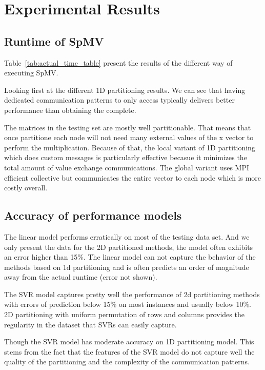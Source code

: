 \documentclass[sigconf,review,anonymous]{acmart}
\begin{document}
\section{Experimental Results}

\subsection{Runtime of SpMV}

Table~\ref{tab:actual_time_table} present the results of the different way of executing SpMV.

Looking first at the different 1D partitioning results. We can see
that having dedicated communication patterns to only access typically
delivers better performance than obtaining the complete.

The matrices in the testing set are mostly well partitionable. That
means that once partitione each node will not need many external
values of the x vector to perform the multiplication. Because of that,
the local variant of 1D partitioning which does custom messages is
particularly effective becasue it minimizes the total amount of value
exchange communications. The global variant uses MPI efficient
collective but communicates the entire vector to each node which is
more costly overall.



\subsection{Accuracy of performance models}

The linear model performs erratically on most of the testing data
set. And we only present the data for the 2D partitioned methods, the
model often exhibits an error higher than 15\%. The linear model can
not capture the behavior of the methods based on 1d partitioning and
is often predicts an order of magnitude away from the actual runtime
(error not shown).

The SVR model captures pretty well the performance of 2d partitioning
methods with errors of prediction below 15\% on most instances and
usually below 10\%. 2D partitioning with uniform permutation of rows
and columns provides the regularity in the dataset that SVRs can
easily capture.

Though the SVR model has moderate accuracy on 1D partitioning
model. This stems from the fact that the features of the SVR model do
not capture well the quality of the partitioning and the complexity of
the communication patterns.
\end{document}
